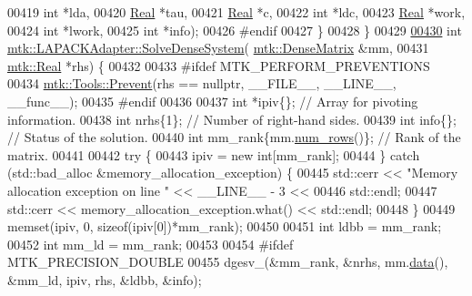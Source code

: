 \begin{DoxyCode}
00419              \textcolor{keywordtype}{int} *lda,
00420              \hyperlink{group__c01-roots_gac080bbbf5cbb5502c9f00405f894857d}{Real} *tau,
00421              \hyperlink{group__c01-roots_gac080bbbf5cbb5502c9f00405f894857d}{Real} *c,
00422              \textcolor{keywordtype}{int} *ldc,
00423              \hyperlink{group__c01-roots_gac080bbbf5cbb5502c9f00405f894857d}{Real} *work,
00424              \textcolor{keywordtype}{int} *lwork,
00425              \textcolor{keywordtype}{int} *info);
00426 \textcolor{preprocessor}{#endif}
00427 \}
00428 \}
00429 
\hypertarget{mtk__lapack__adapter_8cc_source_l00430}{}\hyperlink{classmtk_1_1LAPACKAdapter_a7428bccf74fd4a4af68fb7233846da22}{00430} \textcolor{keywordtype}{int} \hyperlink{classmtk_1_1LAPACKAdapter_a7428bccf74fd4a4af68fb7233846da22}{mtk::LAPACKAdapter::SolveDenseSystem}(
      \hyperlink{classmtk_1_1DenseMatrix}{mtk::DenseMatrix} &mm,
00431                                          \hyperlink{group__c01-roots_gac080bbbf5cbb5502c9f00405f894857d}{mtk::Real} *rhs) \{
00432 
00433 \textcolor{preprocessor}{  #ifdef MTK\_PERFORM\_PREVENTIONS}
00434   \hyperlink{classmtk_1_1Tools_a332324c6f25e66be9dff48c5987a3b9f}{mtk::Tools::Prevent}(rhs == \textcolor{keyword}{nullptr}, \_\_FILE\_\_, \_\_LINE\_\_, \_\_func\_\_);
00435 \textcolor{preprocessor}{  #endif}
00436 
00437   \textcolor{keywordtype}{int} *ipiv\{\};                \textcolor{comment}{// Array for pivoting information.}
00438   \textcolor{keywordtype}{int} nrhs\{1\};                \textcolor{comment}{// Number of right-hand sides.}
00439   \textcolor{keywordtype}{int} info\{\};                 \textcolor{comment}{// Status of the solution.}
00440   \textcolor{keywordtype}{int} mm\_rank\{mm.\hyperlink{classmtk_1_1DenseMatrix_a53f3afb3b6a8d21854458aaa9663cc74}{num\_rows}()\}; \textcolor{comment}{// Rank of the matrix.}
00441 
00442   \textcolor{keywordflow}{try} \{
00443     ipiv = \textcolor{keyword}{new} \textcolor{keywordtype}{int}[mm\_rank];
00444   \} \textcolor{keywordflow}{catch} (std::bad\_alloc &memory\_allocation\_exception) \{
00445     std::cerr << \textcolor{stringliteral}{"Memory allocation exception on line "} << \_\_LINE\_\_ - 3 <<
00446       std::endl;
00447     std::cerr << memory\_allocation\_exception.what() << std::endl;
00448   \}
00449   memset(ipiv, 0, \textcolor{keyword}{sizeof}(ipiv[0])*mm\_rank);
00450 
00451   \textcolor{keywordtype}{int} ldbb = mm\_rank;
00452   \textcolor{keywordtype}{int} mm\_ld = mm\_rank;
00453 
00454 \textcolor{preprocessor}{  #ifdef MTK\_PRECISION\_DOUBLE}
00455   dgesv\_(&mm\_rank, &nrhs, mm.\hyperlink{classmtk_1_1DenseMatrix_a0c33b8a9e01d157c61ddbdf807c25d84}{data}(), &mm\_ld, ipiv, rhs, &ldbb, &info);

\end{DoxyCode}
